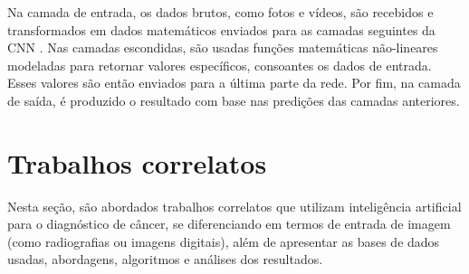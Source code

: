 Na camada de entrada, os dados brutos, como fotos e vídeos, são recebidos e transformados em dados matemáticos enviados para as camadas seguintes da CNN \cite{cnn}. Nas camadas escondidas, são usadas funções matemáticas não-lineares modeladas para retornar valores específicos, consoantes os dados de entrada. Esses valores são então enviados para a última parte da rede. Por fim, na camada de saída, é produzido o resultado com base nas predições das camadas anteriores.








%
\section{\esp Trabalhos correlatos} \label{trabcorr}






Nesta seção, são abordados trabalhos correlatos que utilizam inteligência artificial para o diagnóstico de câncer, se diferenciando em termos de entrada de imagem (como radiografias ou imagens digitais), além de apresentar as bases de dados usadas, abordagens, algoritmos e análises dos resultados. 

